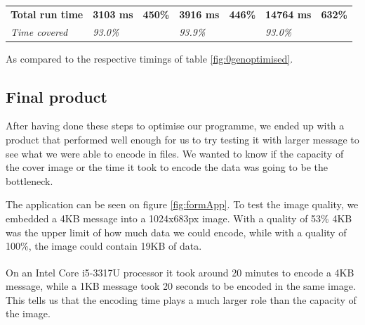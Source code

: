 \begin{table}[H]
\begin{tabular}{@{}lllllll@{}}
		\textbf{Total run time} & \textbf{3103 ms}                                                                          & \textbf{450\%}                                                                 & \textbf{3916 ms}                                                                           & \textbf{446\%}                                                                & \textbf{14764 ms}                                                                       & \textbf{632\%}                                                                \\
		\textit{Time covered}   & \textit{93.0\%}                                                                           & \textit{}                                                                      & \textit{93.9\%}                                                                            &                                                                               & \textit{93.0\%}                                                                         & \textit{}                                                                     \\ \bottomrule
	\end{tabular}
	\begin{tablenotes}
		\footnotesize{\item \textdagger As compared to the respective timings of table \ref{fig:0genoptimised}.}
	\end{tablenotes}
\end{table}

\subsection{Final product}
After having done these steps to optimise our programme, we ended up with a product that performed well enough for us to try testing it with larger message to see what we were able to encode in files.
We wanted to know if the capacity of the cover image or the time it took to encode the data was going to be the bottleneck.

The application can be seen on figure \ref{fig:formApp}. To test the image quality, we embedded a 4KB message into a 1024x683px image. With a quality of 53\% 4KB was the upper limit of how much data we could encode, while with a quality of 100\%, the image could contain 19KB of data.

On an Intel{\textregistered} Core\textsuperscript{\texttrademark} i5-3317U processor it took around 20 minutes to encode a 4KB message, while a 1KB message took 20 seconds to be encoded in the same image. This tells us that the encoding time plays a much larger role than the capacity of the image.

